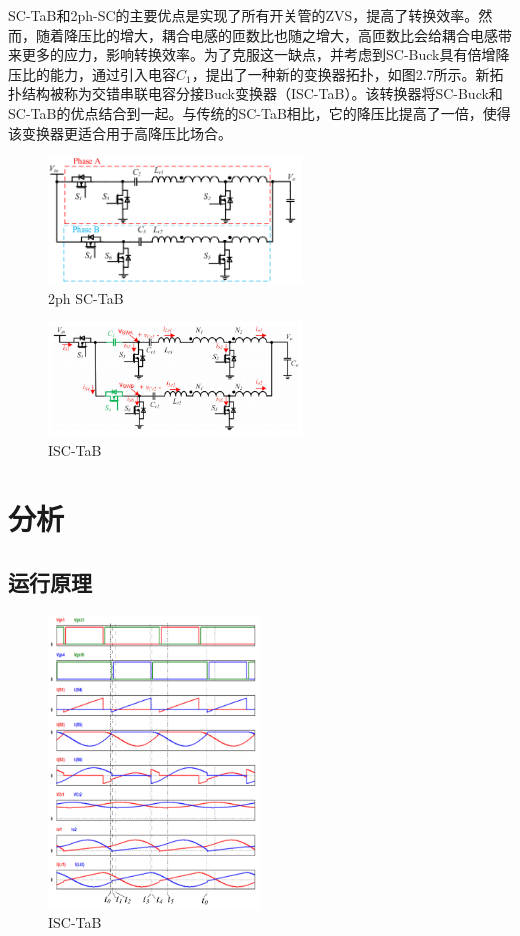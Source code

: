 \documentclass[12pt,a4paper]{report}
\begin{document}
SC-TaB和2ph-SC的主要优点是实现了所有开关管的ZVS，提高了转换效率。然而，随着降压比的增大，耦合电感的匝数比也随之增大，高匝数比会给耦合电感带来更多的应力，影响转换效率。为了克服这一缺点，并考虑到SC-Buck具有倍增降压比的能力，通过引入电容$C_1$，提出了一种新的变换器拓扑，如图2.7所示。新拓扑结构被称为交错串联电容分接Buck变换器（ISC-TaB）。该转换器将SC-Buck和SC-TaB的优点结合到一起。与传统的SC-TaB相比，它的降压比提高了一倍，使得该变换器更适合用于高降压比场合。
\newline

\begin{figure}[h]
    \centering
    \includegraphics[width = 0.6\textwidth]{figures/2ph SC-TaB.png}
    \caption{2ph SC-TaB}
\end{figure}

\begin{figure}[h]
    \centering
    \includegraphics[width = 0.6\textwidth]{figures/circuit diagram1.png}
    \caption{ISC-TaB}
\end{figure}

\chapter{分析}
\section{运行原理}

\begin{figure}[h]
    \centering
    \includegraphics[width = 0.5\textwidth]{figures/waveform.png}
    \caption{ISC-TaB}
\end{figure}
\end{document}
